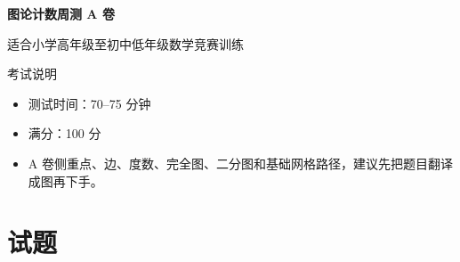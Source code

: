\documentclass[11pt,a4paper,fontset=fandol]{ctexart}
\begin{document}
\thispagestyle{empty}
\begin{center}
{\fontsize{22}{28}\selectfont\bfseries 图论计数周测 A 卷\par}
\vspace{0.4cm}
{\large 适合小学高年级至初中低年级数学竞赛训练\par}
\end{center}

\begin{infobox}{考试说明}
\begin{itemize}
  \item 测试时间：70--75 分钟
  \item 满分：100 分
  \item A 卷侧重点、边、度数、完全图、二分图和基础网格路径，建议先把题目翻译成图再下手。
\end{itemize}
\end{infobox}

\section{试题}
\end{document}
